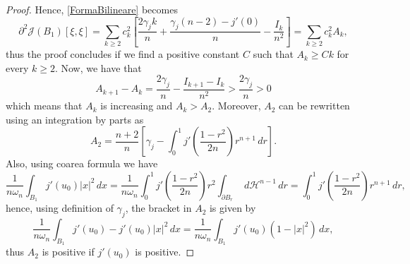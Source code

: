 \documentclass[oneside,a4paper,11pt,notitlepage]{article}
\newcommand{\abs}[1]{{\left|#1\right|}}
\newcommand{\dH}{\,d\mathcal{H}^{n-1}}
\theoremstyle{definition}
\theoremstyle{plain}
\theoremstyle{definition}
\begin{document}
\begin{proof}
    Hence, \eqref{FormaBilineare} becomes
    \begin{equation*}
        \partial^2 \mathcal{J}(B_1)[\xi,\xi]=\sum_{k\geq2}c_k^2\left[\frac{2\gamma_jk}{n}+\frac{\gamma_j(n-2)-j'(0)}{n}-\frac{I_k}{n^2}\right]=\sum_{k\geq2}c_k^2A_k,
    \end{equation*}
    thus the proof concludes if we find a positive constant $C$ such that $A_k\geq Ck$ for every $k\geq2$. Now, we have that 
    \begin{equation*}
        A_{k+1}-A_k=\frac{2\gamma_j}{n}-\frac{I_{k+1}-I_k}{n^2}>\frac{2\gamma_j}{n}>0
    \end{equation*}
    which means that $A_k$ is increasing and $A_k>A_2$. Moreover, $A_2$ can be rewritten using an integration by parts as
    \begin{equation*}
        A_2=\frac{n+2}{n}\left[\gamma_j-\int_0^1j'\left(\frac{1-r^2}{2n}\right)r^{n+1}\,dr\right].
    \end{equation*}
    Also, using coarea formula we have
    \begin{equation*}
        \frac{1}{n\omega_n}\int_{B_1}j'(u_0)\abs{x}^2\,dx=\frac{1}{n\omega_n}\int_0^1j'\left(\frac{1-r^2}{2n}\right)r^2\int_{\partial B_r}\,\dH\,dr=\int_0^1j'\left(\frac{1-r^2}{2n}\right)r^{n+1}\,dr,
    \end{equation*}
    hence, using definition of $\gamma_j$, the bracket in $A_2$ is given by
    \begin{equation*}
        \frac{1}{n\omega_n}\int_{B_1} j'(u_0)-j'(u_0)\abs{x}^2\,dx=\frac{1}{n\omega_n}\int_{B_1} j'(u_0)(1-\abs{x}^2)\,dx,
    \end{equation*}
    thus $A_2$ is positive if $j'(u_0)$ is positive.


\end{proof}
\end{document}
